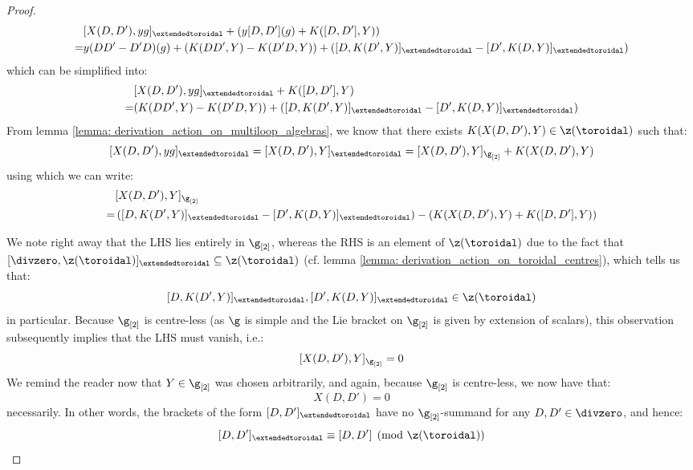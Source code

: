 \begin{proof}
                    $$
                        \begin{aligned}
                            & [ X(D, D') , y g ]_{\extendedtoroidal} + \left( y [D, D'](g) + K([D, D'], Y) \right)
                            \\
                            = & y (DD' - D'D)( g ) + ( K(DD', Y) - K(D'D, Y) ) + ( [ D, K(D', Y) ]_{\extendedtoroidal} - [ D', K(D, Y) ]_{\extendedtoroidal} )
                        \end{aligned}
                    $$
                which can be simplified into:
                    $$
                        \begin{aligned}
                            & [ X(D, D') , y g ]_{\extendedtoroidal} + K([D, D'], Y)
                            \\
                            = & ( K(DD', Y) - K(D'D, Y) ) + ( [ D, K(D', Y) ]_{\extendedtoroidal} - [ D', K(D, Y) ]_{\extendedtoroidal} )
                        \end{aligned}
                    $$
                From lemma \ref{lemma: derivation_action_on_multiloop_algebras}, we know that there exists $K( X(D, D'), Y ) \in \z(\toroidal)$ such that:
                    $$[ X(D, D') , y g ]_{\extendedtoroidal} = [ X(D, D') , Y ]_{\extendedtoroidal} = [X(D, D'), Y]_{\g_{[2]}} + K( X(D, D'), Y )$$
                using which we can write:
                    $$
                        \begin{aligned}
                            & [X(D, D'), Y]_{\g_{[2]}}
                            \\
                            = & \left( [ D, K(D', Y) ]_{\extendedtoroidal} - [ D', K(D, Y) ]_{\extendedtoroidal} \right) - \left( K( X(D, D'), Y ) + K([D, D'], Y) \right)
                        \end{aligned}
                    $$
                    
                We note right away that the LHS lies entirely in $\g_{[2]}$, whereas the RHS is an element of $\z(\toroidal)$ due to the fact that $[\divzero, \z(\toroidal)]_{\extendedtoroidal} \subseteq \z(\toroidal)$ (cf. lemma \ref{lemma: derivation_action_on_toroidal_centres}), which tells us that:
                    $$[ D, K(D', Y) ]_{\extendedtoroidal}, [ D', K(D, Y) ]_{\extendedtoroidal} \in \z(\toroidal)$$
                in particular. Because $\g_{[2]}$ is centre-less (as $\g$ is simple and the Lie bracket on $\g_{[2]}$ is given by extension of scalars), this observation subsequently implies that the LHS must vanish, i.e.:
                    $$[X(D, D'), Y]_{\g_{[2]}} = 0$$
                We remind the reader now that $Y \in \g_{[2]}$ was chosen arbitrarily, and again, because $\g_{[2]}$ is centre-less, we now have that:
                    $$X(D, D') = 0$$
                necessarily. In other words, the brackets of the form $[D, D']_{\extendedtoroidal}$ have no $\g_{[2]}$-summand for any $D, D' \in \divzero$, and hence:
                    $$[D, D']_{\extendedtoroidal} \equiv [D, D'] \pmod{\z(\toroidal)}$$
            \end{proof}

